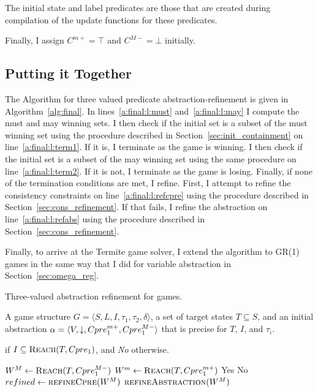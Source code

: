 The initial state and label predicates are those that are created during compilation of the update functions for these predicates.

Finally, I assign $C^{m+}=\top$ and $C^{M-}=\bot$ initially.

\subsection{Putting it Together}

The Algorithm for three valued predicate abstraction-refinement is given in Algorithm~\ref{alg:final}. In lines~\ref{a:final:l:must} and~\ref{a:final:l:may} I compute the must and may winning sets. I then check if the initial set is a subset of the must winning set using the procedure described in Section~\ref{sec:init_containment} on line~\ref{a:final:l:term1}. If it is, I terminate as the game is winning. I then check if the initial set is a subset of the may winning set using the same procedure on line~\ref{a:final:l:term2}. If it is not, I terminate as the game is losing. Finally, if none of the termination conditions are met, I refine. First, I attempt to refine the consistency constraints on line~\ref{a:final:l:refcpre} using the procedure described in Section~\ref{sec:cons_refinement}. If that fails, I refine the abstraction on line~\ref{a:final:l:refabs} using the procedure described in Section~\ref{sec:cons_refinement}.

Finally, to arrive at the Termite game solver, I extend the algorithm to GR(1) games in the same way that I did for variable abstraction in Section~\ref{sec:omega_reg}.

\begin{algorithm}
\caption{Three-valued abstraction refinement for games.}
\label{alg:final}

\begin{algorithmic}[1]

\Require A game structure $G = \langle S, L, I, \tau_1, \tau_2, \delta \rangle$, a set of target states $T\subseteq S$, and an initial abstraction $\alpha=\langle V, \mathord{\downarrow}, Cpre_1^{m+}, Cpre_1^{M-} \rangle$ that is precise for $T$, $I$, and $\tau_i$.

 if $I \subseteq \textsc{Reach}(T, Cpre_1)$, and {\it No} otherwise.

    \Loop
        \State $W^M \gets \textsc{Reach}(T, Cpre_1^{M-})$             \label{a:final:l:must}
        \State $W^m \gets \textsc{Reach}(T, Cpre_1^{m+})$             \label{a:final:l:may}
            \label{a:final:l:term1}
            \State\Return Yes
         \label{a:final:l:term2}
            \State\Return No
        \Else       
            \State $refined \gets \Call{refineCpre}{W^M}$     \label{a:final:l:refcpre}
                \State$\Call{refineAbstraction}{W^M}$         \label{a:final:l:refabs}
            \EndIf
        \EndIf
    \EndLoop
\EndFunction

\end{algorithmic}
\end{algorithm}


